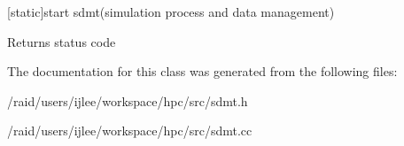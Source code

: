 \mbox{[}static\mbox{]}start sdmt(simulation process and data management) 

\begin{DoxyReturn}{Returns}
status code 
\end{DoxyReturn}


The documentation for this class was generated from the following files\+:\begin{DoxyCompactItemize}
\item 
/raid/users/ijlee/workspace/hpc/src/sdmt.\+h\item 
/raid/users/ijlee/workspace/hpc/src/sdmt.\+cc\end{DoxyCompactItemize}
